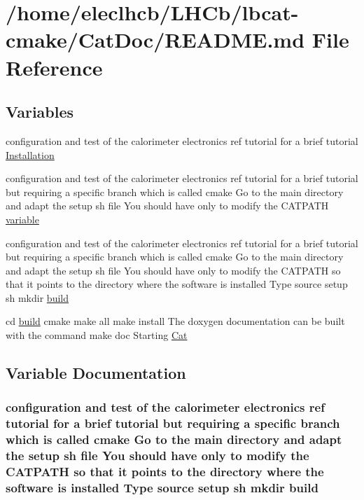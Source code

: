 \hypertarget{README_8md}{
\section{/home/eleclhcb/LHCb/lbcat-\/cmake/CatDoc/README.md File Reference}
\label{README_8md}
}
\subsection*{Variables}
\begin{DoxyCompactItemize}
\item 
configuration and test of the calorimeter electronics ref tutorial for a brief tutorial \hyperlink{README_8md_a9b652498336c8f96f76b340ed2fdee76}{Installation}
\item 
configuration and test of the calorimeter electronics ref tutorial for a brief tutorial but requiring a specific branch which is called cmake Go to the main directory and adapt the setup sh file You should have only to modify the CATPATH \hyperlink{README_8md_aa9be1efea44c73a389d100be792af698}{variable}
\item 
configuration and test of the calorimeter electronics ref tutorial for a brief tutorial but requiring a specific branch which is called cmake Go to the main directory and adapt the setup sh file You should have only to modify the CATPATH so that it points to the directory where the software is installed Type source setup sh mkdir \hyperlink{README_8md_a2fe43ace0e508677fb73daee77d896eb}{build}
\item 
cd \hyperlink{README_8md_a2fe43ace0e508677fb73daee77d896eb}{build} cmake make all make install The doxygen documentation can be built with the command make doc Starting \hyperlink{README_8md_a42ba74587490858a93b849de135dfa64}{Cat}
\end{DoxyCompactItemize}


\subsection{Variable Documentation}
\hypertarget{README_8md_a2fe43ace0e508677fb73daee77d896eb}{
\subsubsection[{build}]{\setlength{\rightskip}{0pt plus 5cm}configuration and test of the calorimeter electronics ref tutorial for a brief tutorial but requiring a specific branch which is called cmake Go to the main directory and adapt the setup sh file You should have only to modify the CATPATH so that it points to the directory where the software is installed Type source setup sh mkdir {\bf build}}}
\label{README_8md_a2fe43ace0e508677fb73daee77d896eb}


